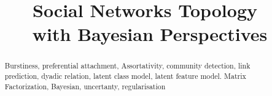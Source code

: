 \documentclass[journal]{IEEEtran}
\title{Social Networks Topology\\ with Bayesian Perspectives}
\begin{document}
	
\maketitle
\begin{abstract}
Burstiness, preferential attachment, Assortativity, community detection, link prediction, dyadic relation, latent class model, latent feature model. Matrix Factorization, Bayesian, uncertanty, regularisation
\end{abstract}

\IEEEpeerreviewmaketitle













\clearpage



%
%
\end{document}
